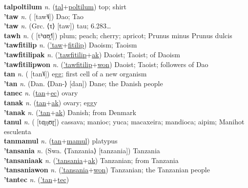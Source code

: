 \textbf{talpoltilum} \textit{n.} (\hyperref[tal]{tal}+\hyperref[poltilum]{poltilum})
top; shirt \label{talpoltilum} \\
\textbf{'taw} \textit{n.} ( [taw˥˩])
Dao; Tao \label{'taw} \\
\textbf{'taw} \textit{n.} (Grc. ⟨τ⟩ [taw])
tau; 6.283… \label{'taw} \\
\textbf{tawh} \textit{n.} ( [tʰɑʊ̯˧˥])
plum; peach; cherry; apricot; Prunus minus Prunus dulcis \label{tawh} \\
\textbf{'tawfitilip} \textit{n.} (\hyperref['taw]{'taw}+\hyperref[fitilip]{fitilip})
Daoism; Taoism \label{'tawfitilip} \\
\textbf{'tawfitilipak} \textit{n.} (\hyperref['tawfitilip]{'tawfitilip}+\hyperref[ak]{ak})
Daoist; Taoist; of Daoism \label{'tawfitilipak} \\
\textbf{'tawfitilipwon} \textit{n.} (\hyperref['tawfitilip]{'tawfitilip}+\hyperref[won]{won})
Daoist; Taoist; followers of Dao \label{'tawfitilipwon} \\
\textbf{tan} \textit{n.} ( [tan˥˩])
egg; first cell of a new organism \label{tan} \\
\textbf{'tan} \textit{n.} (Dan. ⟨Dan-⟩ [dan])
Dane; the Danish people \label{'tan} \\
\textbf{tanec} \textit{n.} (\hyperref[tan]{tan}+\hyperref[ec]{ec})
ovary \label{tanec} \\
\textbf{tanak} \textit{n.} (\hyperref[tan]{tan}+\hyperref[ak]{ak})
ovary; eggy \label{tanak} \\
\textbf{'tanak} \textit{n.} (\hyperref['tan]{'tan}+\hyperref[ak]{ak})
Danish; from Denmark \label{'tanak} \\
\textbf{tanul} \textit{n.} ( [tɑ̤ŋʊɽ])
cassava; manioc; yuca; macaxeira; mandioca; aipim; Manihot esculenta \label{tanul} \\
\textbf{tanmamul} \textit{n.} (\hyperref[tan]{tan}+\hyperref[mamul]{mamul})
platypus \label{tanmamul} \\
\textbf{'tansania} \textit{n.} (Swa. ⟨Tanzania⟩ [tanzania])
Tanzania \label{'tansania} \\
\textbf{'tansaniaak} \textit{n.} (\hyperref['tansania]{'tansania}+\hyperref[ak]{ak})
Tanzanian; from Tanzania \label{'tansaniaak} \\
\textbf{'tansaniawon} \textit{n.} (\hyperref['tansania]{'tansania}+\hyperref[won]{won})
Tanzanian; the Tanzanian people \label{'tansaniawon} \\
\textbf{'tantec} \textit{n.} (\hyperref['tan]{'tan}+\hyperref[tec]{tec})
